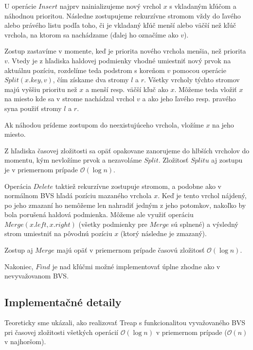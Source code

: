 \documentclass[a4paper, 12pt]{article}
\theoremstyle{definition}
\begin{document}
\bigskip

U operácie $Insert$ najprv nainializujeme nový vrchol $x$ s vkladaným kľúčom a
náhodnou prioritou. Následne zostupujeme rekurzívne stromom vždy do ľavého
alebo právého listu podľa toho, či je vkladaný kľúč menší alebo väčší než kľúč
vrchola, na ktorom sa nachádzame (ďalej ho označíme ako $v$).

Zostup zastavíme v momente, keď je priorita nového vrchola menšia, než priorita
$v$. Vtedy je z hľadiska haldovej podmienky vhodné umiestniť nový prvok na
aktuálnu pozíciu, rozdelíme teda podstrom s koreňom $v$ pomocou operácie
$Split(x.key, v)$, čím získame dva stromy $l$ a $r$. Všetky vrcholy týchto
stromov majú vyššiu prioritu než $x$ a menší resp. väčší kľuč ako $x$. Môžeme
teda vložiť $x$ na miesto kde sa v strome nachádzal vrchol $v$ a ako jeho
ľavého resp. pravého syna použiť stromy $l$ a $r$.

Ak náhodou prídeme zostupom do neexistujúceho vrchola, vložíme $x$ na jeho
miesto.

Z hľadiska časovej zložitosti sa opäť opakovane zanorujeme do hlbších vrcholov
do momentu, kým nevložíme prvok a nezavoláme $Split$. Zložitosť $Splitu$ aj
zostupu je v priemernom prípade $\mathcal{O}(\log n)$.

\bigskip

Operácia $Delete$ taktiež rekurzívne zostupuje stromom, a podobne ako v
normálnom BVS hľadá pozíciu mazaného vrchola $x$. Keď je tento vrchol nájdený, po
jeho zmazaní ho nemôžeme len nahradiť jedným z jeho potomkov, nakoľko by bola
porušená haldová podmienka. Môžeme ale využiť operáciu
$Merge(x.left, x.right)$ (všetky podmienky pre $Merge$ sú splnené) a výsledný
strom umiestniť na pôvodnú pozíciu $x$ (ktorý následne je zmazaný).

Zostup aj $Merge$ majú opäť v priemernom prípade časovú zložitosť
$\mathcal{O}(\log n)$.

\bigskip

Nakoniec, $Find$ je nad kľúčmi možné implementovať úplne zhodne ako v
nevyvažovanom BVS.

\subsection{Implementačné detaily}

Teoreticky sme ukázali, ako realizovať Treap s funkcionalitou vyvažovaného BVS
pri časovej zložitosti všetkých operácií $\mathcal{O}(\log n)$ v priemernom
prípade ($\mathcal{O}(n)$ v najhoršom).
\end{document}
